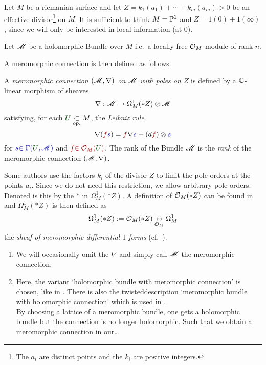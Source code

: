 Let $M$ be a riemanian surface and let $Z=k_1(a_1)+\cdots+k_m(a_m)>0$ be an
effective divisor\footnote{The $a_i$ are distinct points and the $k_i$ are
positive integers.} on $M$.
It is sufficient to think $M=\P^1$ and $Z=1(0)+1(\infty)$\TODO[\infty?], since
we will only be interested in local information (at $0$).

Let $\sM$ be a holomorphic Bundle over $M$ i.e.\ a locally free $\cO_M$-module
of rank $n$.

A meromorphic connection is then defined as follows.
\begin{defn}\label{defn:mercon}
  \def\myU{\textcolor{green!30!black}{U}}
  \def\mys{\textcolor{blue!60!black}{s}}
  \def\myf{\textcolor{red!60!black}{f}}
  A \emph{meromorphic connection $(\sM,\nabla)$ on $\sM$ with poles on $Z$}
  is defined by a $\C$-linear morphism of sheaves
  \[
    \nabla:\sM\to\Omega_M^1(*Z)\otimes\sM
  \]
  satisfying, for each $\myU\underset{\text{op.}}{\subset} M$, the
  \emph{Leibniz rule}
    \[
      \nabla(\myf\mys)=\myf\nabla\mys+(d\myf)\otimes\mys
    \]
  for $\mys\textcolor{blue!60!black}{\in\Gamma(\myU,\sM)}$ and
  $\myf\textcolor{red!60!black}{\in\cO_M(\myU)}$.
  The rank of the Bundle $\sM$ is the \emph{rank} of the meromorphic connection
  $(\sM,\nabla)$.
  \begin{s-rem}
    Some authors use the factors $k_i$ of the divisor $Z$ to limit the pole
    orders at the points $a_i$. Since we do not need this restriction, we allow
    arbitrary pole orders. Denoted is this by the $*$ in $\Omega_M^1(*Z)$.
    A definition of $\cO_M(*Z)$ can be found
    in~\cite[Sec.0.8]{sabbah2007isomonodromic} and $\Omega_M^1(*Z)$ is then
    defined as
    \[
      \Omega_M^1(*Z):=\cO_M(*Z)\underset{\cO_M}\otimes\Omega_M^1
    \]
    the \emph{sheaf of meromorphic differential $1$-forms} (cf.\
    \cite[Sec.0.9.b]{sabbah2007isomonodromic}).
  \end{s-rem}
\end{defn}
\begin{rem}
  \begin{enumerate}
    \item We will occasionally omit the $\nabla$ and simply call $\sM$ the
      meromorphic connection.
    \item Here, the variant `holomorphic bundle with meromorphic connection' is
      chosen, like in \cite{boalch}.
      There is also the twisted description `meromorphic
      bundle with holomorphic connection' which is used in
      \cite{sabbah2007isomonodromic}.
      \\ By choosing a lattice of a meromorphic bundle, one gets a holomorphic
      bundle but the connection is no longer holomorphic. Such that we obtain a
      meromorphic connection in our\dots\TODO
  \end{enumerate}
\end{rem}

